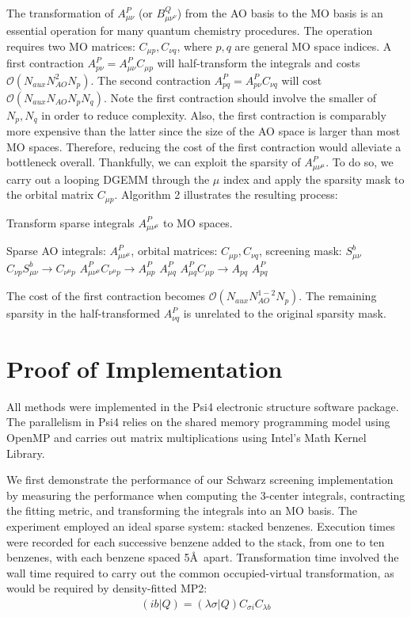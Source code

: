 The transformation of $A_{\mu \nu}^P$ (or $B_{\mu \nu^\nu}^Q$) from the AO basis to the MO basis is 
an essential operation for many quantum 
chemistry procedures. The operation requires two MO matrices: $C_{\mu p}, C_{\nu q}$, where $p, q$ are general MO space
indices. A first contraction $A_{p \nu}^P=A_{\mu \nu}^PC_{\mu p}$ will half-transform the integrals and costs 
$\mathcal{O}(N_{aux}N_{AO}^2N_p)$. The second contraction $A_{p q}^P=A_{p \nu}^PC_{\nu q}$ will cost
$\mathcal{O}(N_{aux}N_{AO}N_pN_q)$.
Note the first contraction should involve the smaller of $N_p, N_q$ in order to reduce complexity. Also, the first contraction
is comparably more expensive than the latter since the size of the AO space is larger than most MO spaces. Therefore,
reducing the cost of the first contraction would alleviate a bottleneck overall. 
Thankfully, we can exploit the sparsity of $A_{\mu \nu^\mu}^P$.
To do so, we carry out a looping DGEMM through the $\mu$ index and apply the sparsity mask to the orbital matrix $C_{\mu p}$.
Algorithm 2 illustrates the resulting process:

\begin{algorithm}[H]
\caption{Transform sparse integrals $A_{\mu \nu^\mu}^P$ to MO spaces.}
\begin{algorithmic}
\REQUIRE Sparse AO integrals: $A_{\mu \nu^\mu}^P$, orbital matrices: $C_{\mu p}, C_{\nu q}$, screening mask: $S_{\mu \nu}^b$
    \STATE $C_{\nu p}S_{\mu \nu}^b \rightarrow C_{\nu^{\mu} p}$
    \STATE $A_{\mu \nu^{\mu}}^P C_{\nu^{\mu} p} \rightarrow A_{\mu p}^P$
\ENDFOR
\RETURN $A_{\mu q}^P$
\STATE $A_{\mu q}^PC_{\mu p} \rightarrow A_{p q}$
\RETURN $A_{p q}^P$
\end{algorithmic}
\end{algorithm}

\noindent The cost of the first contraction becomes $\mathcal{O}(N_{aux}N_{AO}^{1-2}N_p)$. 
The remaining sparsity in the half-transformed $A_{\nu q}^P$ is unrelated to the original sparsity mask.


\section{Proof of Implementation}
All methods were implemented in the {\sc Psi4} electronic structure software package.
The parallelism in {\sc Psi4} relies on the shared memory programming model using OpenMP 
and carries out matrix multiplications using Intel's Math Kernel
Library. 

We first demonstrate the performance of our Schwarz screening implementation 
by measuring the performance when computing the 3-center integrals, contracting the fitting metric,
and transforming the integrals into an MO basis.
The experiment employed an ideal sparse system: stacked benzenes. Execution times were recorded for each successive benzene
added to the stack, from one to ten benzenes, with each benzene spaced 5\AA\ apart.
Transformation time involved the wall time required to carry out the common occupied-virtual
transformation, as would be required by density-fitted MP2: 
\begin{align} 
(i b | Q) = (\lambda \sigma | Q) C_{\sigma i} C_{\lambda b} 
\end{align}

